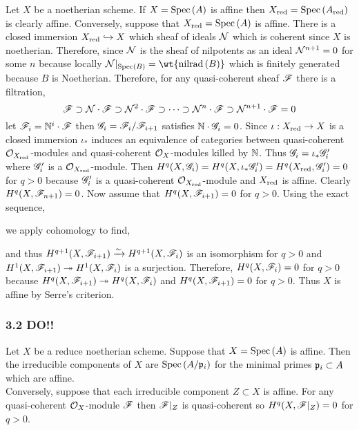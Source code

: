 \documentclass[12pt]{article}
\begin{document}
Let $X$ be a noetherian scheme. If $X = \mathrm{Spec}\left( A \right)$ is affine then $X_{\mathrm{red}} = \mathrm{Spec}\left( A_{\mathrm{red}} \right)$ is clearly affine. Conversely, suppose that $X_{\mathrm{red}} = \mathrm{Spec}\left( A \right)$ is affine. There is a closed immersion $X_{\mathrm{red}} \hookrightarrow X$ which sheaf of ideals $\mathcal{N}$ which is coherent since $X$ is noetherian. Therefore, since $\mathcal{N}$ is the sheaf of nilpotents as an ideal $\mathcal{N}^{n+1} = 0$ for some $n$ because locally $\sN |_{\Spec{B}} = \wt{\nilrad{B}}$ which is finitely generated because $B$ is Noetherian. Therefore, for any quasi-coherent sheaf $\mathscr{F}$ there is a filtration,
\[ \mathscr{F} \supset \mathcal{N} \cdot \mathscr{F} \supset \mathcal{N}^2 \cdot \mathscr{F} \supset \cdots \supset \mathcal{N}^n \cdot \mathscr{F} \supset \mathcal{N}^{n+1} \cdot \mathscr{F} = 0 \]
let $\mathscr{F}_i = \mathbb{N}^i \cdot \mathscr{F}$ then $\mathscr{G}_i = \mathscr{F}_i / \mathscr{F}_{i+1}$ satisfies $\mathbb{N} \cdot \mathscr{G}_i = 0$. Since $\iota : X_{\mathrm{red}} \to X$ is a closed immersion $\iota_*$ induces an equivalence of categories between quasi-coherent $\mathcal{O}_{X_{\mathrm{red}}}$-modules and quasi-coherent $\mathcal{O}_{X}$-modules killed by $\mathbb{N}$. Thus $\mathscr{G}_i = \iota_* \mathscr{G}_i'$ where $\mathscr{G}_i'$ is a $\mathcal{O}_{X_{\mathrm{red}}}$-module. Then $H^q(X, \mathscr{G}_i) = H^q(X, \iota_* \mathscr{G}_i') = H^q(X_{\mathrm{red}}, \mathscr{G}_i') = 0$ for $q > 0$ because $\mathscr{G}_i'$ is a quasi-coherent $\mathcal{O}_{X_{\mathrm{red}}}$-module and $X_{\mathrm{red}}$ is affine. Clearly $H^q(X, \mathscr{F}_{n+1}) = 0$. Now assume that $H^q(X, \mathscr{F}_{i+1}) = 0$ for $q > 0$. Using the exact sequence,
\begin{center}
\end{center}
we apply cohomology to find,
\begin{center}
\end{center}
and thus $H^{q+1}(X, \mathscr{F}_{i+1}) \xrightarrow{\sim} H^{q+1}(X, \mathscr{F}_{i})$ is an isomorphism for $q > 0$ and $H^1(X, \mathscr{F}_{i+1}) \twoheadrightarrow H^1(X, \mathscr{F}_i)$ is a surjection. Therefore, $H^q(X, \mathscr{F}_i) = 0$ for $q > 0$ because $H^q(X, \mathscr{F}_{i+1}) \twoheadrightarrow H^q(X, \mathscr{F}_{i})$ and $H^q(X, \mathscr{F}_{i+1}) = 0$ for $q > 0$. Thus $X$ is affine by Serre's criterion.

\subsubsection{3.2 DO!!}

Let $X$ be a reduce noetherian scheme. Suppose that $X = \mathrm{Spec}\left( A \right)$ is affine. Then the irreducible components of $X$ are $\mathrm{Spec}\left( A/\mathfrak{p}_i \right)$ for the minimal primes $\mathfrak{p}_i \subset A$ which are affine. 
\bigskip\\
Conversely, suppose that each irreducible component $Z \subset X$ is affine. For any quasi-coherent $\mathcal{O}_{X}$-module $\mathscr{F}$ then $\mathscr{F}|_Z$ is quasi-coherent so $H^q(X, \mathscr{F}|_Z) = 0$ for $q > 0$.  
\end{document}
